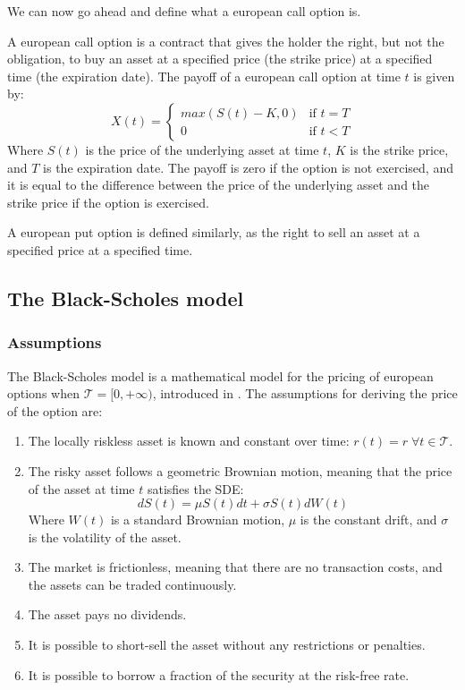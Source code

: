 We can now go ahead and define what a european call option is.
\begin{definition}
    A european call option is a contract that gives the holder the right, but not the obligation, to buy an asset at a specified price (the strike price) at a specified time (the expiration date). The payoff of a european call option at time $t$ is given by:
    \begin{equation}
        X(t) = \begin{cases}
            max(S(t)-K,0) & \text{if } t = T\\
            0 & \text{if } t < T
        \end{cases}
    \end{equation}
    Where $S(t)$ is the price of the underlying asset at time $t$, $K$ is the strike price, and $T$ is the expiration date. The payoff is zero if the option is not exercised, and it is equal to the difference between the price of the underlying asset and the strike price if the option is exercised.
\end{definition}

A european put option is defined similarly, as the right to sell an asset at a specified price at a specified time.

\subsection{The Black-Scholes model}
\subsubsection{Assumptions}
The Black-Scholes model is a mathematical model for the pricing of european options when $\mathcal{T}=[0,+\infty)$, introduced in \cite{black_scholes}. The assumptions for deriving the price of the option are:
\begin{enumerate}
    \item The locally riskless asset is known and constant over time: $r(t) = r \;\forall t\in\mathcal{T}$.
    \item  \label{it:gbm}The risky asset follows a geometric Brownian motion, meaning that the price of the asset at time $t$ satisfies the SDE:
    \begin{equation}
        dS(t) = \mu S(t) dt + \sigma S(t) dW(t)
    \end{equation}
    Where $W(t)$ is a standard Brownian motion, $\mu$ is the constant drift, and $\sigma$ is the volatility of the asset.
    \item The market is frictionless, meaning that there are no transaction costs, and the assets can be traded continuously.
    \item The asset pays no dividends.
    \item It is possible to short-sell the asset without any restrictions or penalties.
    \item It is possible to borrow a fraction of the security at the risk-free rate.
\end{enumerate}

